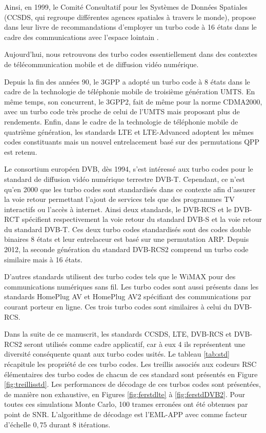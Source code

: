 Ainsi, en 1999, le Comité Consultatif pour les Systèmes de Données Spatiales (CCSDS, qui regroupe différentes agences 
spatiales à travers le monde), propose dans leur livre de recommandations d'employer un turbo code à 16 états dans le cadre 
des communications avec l'espace lointain \cite{ccsdsBluebook}. 

Aujourd'hui, nous retrouvons des turbo codes essentiellement dans des contextes de télécommunication mobile et de diffusion 
vidéo numérique.

Depuis la fin des années 90, le 3GPP a adopté un turbo code à 8 états dans le cadre de la technologie de téléphonie 
mobile de troisième génération UMTS. En même temps, son concurrent, le 3GPP2, fait de même pour la norme CDMA2000, avec 
un turbo code très proche de celui de l'UMTS mais proposant plus de rendements. 
Enfin, dans le cadre de la technologie de téléphonie mobile de quatrième génération, les standards LTE et LTE-Advanced 
\cite{lte} adoptent les mêmes codes constituants mais un nouvel entrelacement basé sur des permutations QPP est retenu.

Le consortium européen DVB, dès 1994, s'est intéressé aux turbo codes pour le standard de diffusion vidéo numérique 
terrestre DVB-T. Cependant, ce n'est qu'en 2000 que les turbo codes sont standardisés dans ce contexte afin d'assurer 
la voie retour permettant l'ajout de services tels que des programmes TV interactifs ou l’accès à internet. Ainsi deux 
standards, le DVB-RCS \cite{dvbrcs} et le DVB-RCT \cite{dvbrct} spécifient respectivement la voie retour du standard 
DVB-S et la voie retour du standard DVB-T. Ces deux turbo codes standardisés sont des codes double binaires 8 états et 
leur entrelaceur est basé sur une permutation ARP. Depuis 2012, la seconde génération du standard DVB-RCS2 \cite{dvbrcs2} 
comprend un turbo code similaire mais à 16 états.

D'autres standards utilisent des turbo codes tels que le WiMAX \cite{wimax} pour des  communications numériques sans fil. 
Les turbo codes sont aussi présents dans les standards HomePlug AV et HomePlug AV2 \cite{hpav} spécifiant des communications 
par courant porteur en ligne. Ces trois turbo codes sont similaires à celui du DVB-RCS.

Dans la suite de ce manuscrit, les standards CCSDS, LTE, DVB-RCS et DVB-RCS2 seront utilisés comme cadre applicatif, car 
à eux 4 ils représentent une diversité conséquente quant aux turbo codes usités. Le tableau \ref{tab:std} récapitule les 
propriété de ces turbo codes. Les treillis associés aux codeurs RSC élémentaires des turbo codes de chacun de ces standard 
sont présentés en Figure \ref{fig:treillisstd}. Les performances de décodage de ces turbos codes sont présentées, de manière 
non exhaustive, en Figures \ref{fig:ferstdlte} à \ref{fig:ferstdDVB2}. Pour toutes ces simulations Monte Carlo, 100 trames 
erronées ont été obtenues par point de SNR. L'algorithme de décodage est l'EML-APP avec comme facteur d'échelle $0,75$ 
durant 8 itérations.


